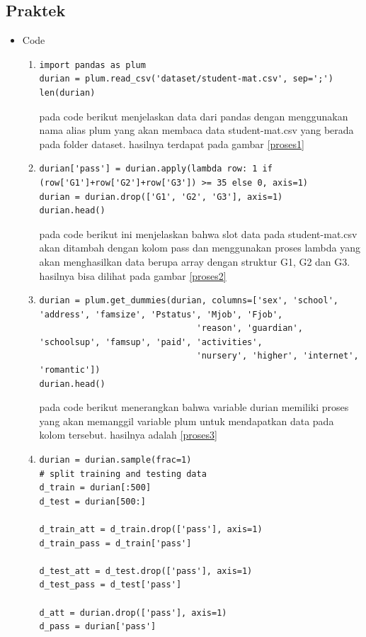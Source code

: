 \subsection {Praktek}
\begin{itemize}
\item Code
\begin{enumerate}
\item
\begin{verbatim}
import pandas as plum
durian = plum.read_csv('dataset/student-mat.csv', sep=';')
len(durian)
\end{verbatim}
\subitem
pada code berikut menjelaskan data dari pandas dengan menggunakan nama alias plum yang akan membaca data student-mat.csv yang berada pada folder dataset. hasilnya terdapat pada gambar \ref{proses1}
\item
\begin{verbatim}
durian['pass'] = durian.apply(lambda row: 1 if (row['G1']+row['G2']+row['G3']) >= 35 else 0, axis=1)
durian = durian.drop(['G1', 'G2', 'G3'], axis=1)
durian.head()
\end{verbatim}
\subitem
pada code berikut ini menjelaskan bahwa slot data pada student-mat.csv akan ditambah dengan kolom pass dan menggunakan proses lambda yang akan menghasilkan data berupa array dengan struktur G1, G2 dan G3. hasilnya bisa dilihat pada gambar \ref{proses2}
\item 
\begin{verbatim}
durian = plum.get_dummies(durian, columns=['sex', 'school', 'address', 'famsize', 'Pstatus', 'Mjob', 'Fjob', 
                               'reason', 'guardian', 'schoolsup', 'famsup', 'paid', 'activities',
                               'nursery', 'higher', 'internet', 'romantic'])
durian.head()

\end{verbatim}
\subitem
pada code berikut menerangkan bahwa variable durian memiliki proses yang akan memanggil variable plum untuk mendapatkan data pada kolom tersebut. hasilnya adalah \ref{proses3}
\item
\begin{verbatim}
durian = durian.sample(frac=1)
# split training and testing data
d_train = durian[:500]
d_test = durian[500:]

d_train_att = d_train.drop(['pass'], axis=1)
d_train_pass = d_train['pass']

d_test_att = d_test.drop(['pass'], axis=1)
d_test_pass = d_test['pass']

d_att = durian.drop(['pass'], axis=1)
d_pass = durian['pass']


\end{verbatim}
\end{enumerate}
\end{itemize}

